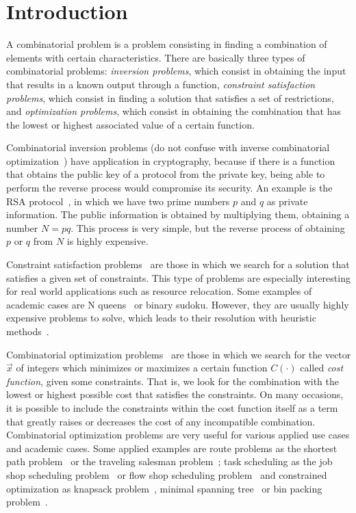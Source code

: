 \section{Introduction}
A combinatorial problem is a problem consisting in finding a combination of elements with certain characteristics. There are basically three types of combinatorial problems: \textit{inversion problems}, which consist in obtaining the input that results in a known output through a function, \textit{constraint satisfaction problems}, which consist in finding a solution that satisfies a set of restrictions, and \textit{optimization problems}, which consist in obtaining the combination that has the lowest or highest associated value of a certain function.

Combinatorial inversion problems (do not confuse with inverse combinatorial optimization~\cite{Inverse_comb}) have application in cryptography, because if there is a function that obtains the public key of a protocol from the private key, being able to perform the reverse process would compromise its security. An example is the RSA protocol~\cite{RSA}, in which we have two prime numbers $p$ and $q$ as private information. The public information is obtained by multiplying them, obtaining a number $N=pq$. This process is very simple, but the reverse process of obtaining $p$ or $q$ from $N$ is highly expensive.

Constraint satisfaction problems~\cite{CSP} are those in which we search for a solution that satisfies a given set of constraints. This type of problems are especially interesting for real world applications such as resource relocation. Some examples of academic cases are N queens~\cite{N_Queens} or binary sudoku. However, they are usually highly expensive problems to solve, which leads to their resolution with heuristic methods~\cite{Heuristics}.


Combinatorial optimization problems~\cite{Combinatorial} are those in which we search for the vector $\vec{x}$ of integers which minimizes or maximizes a certain function $C(\cdot)$ called \textit{cost function}, given some constraints. That is, we look for the combination with the lowest or highest possible cost that satisfies the constraints. On many occasions, it is possible to include the constraints within the cost function itself as a term that greatly raises or decreases the cost of any incompatible combination. Combinatorial optimization problems are very useful for various applied use cases and academic cases. Some applied examples are route problems as the shortest path problem~\cite{A-star,Dijkstra1959} or the traveling salesman problem~\cite{TSP_overview,TSP,TSP2}; task scheduling as the job shop scheduling problem~\cite{JSSP_General,Flexible_JSSP} or flow shop scheduling problem~\cite{FlowShop} and constrained optimization as knapsack problem~\cite{Knapsack_original}, minimal spanning tree~\cite{minimaltree} or bin packing problem~\cite{Bin_Packing}.

